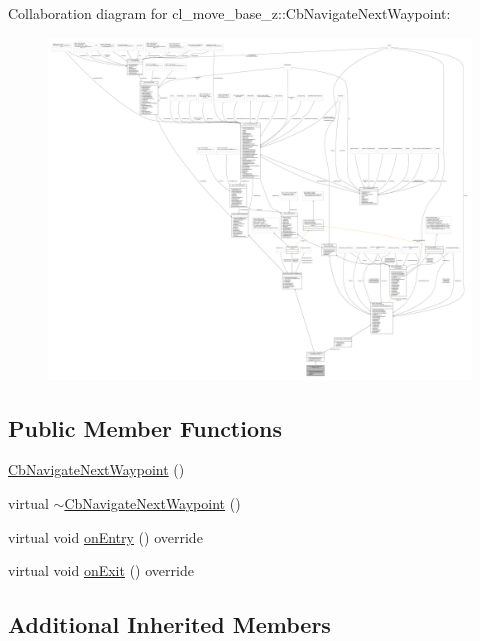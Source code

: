 Collaboration diagram for cl\+\_\+move\+\_\+base\+\_\+z\+:\+:Cb\+Navigate\+Next\+Waypoint\+:
\nopagebreak
\begin{figure}[H]
\begin{center}
\leavevmode
\includegraphics[width=350pt]{classcl__move__base__z_1_1CbNavigateNextWaypoint__coll__graph}
\end{center}
\end{figure}
\subsection*{Public Member Functions}
\begin{DoxyCompactItemize}
\item 
\hyperlink{classcl__move__base__z_1_1CbNavigateNextWaypoint_ae76bae37ab364bf6f48b8a200dd63ced}{Cb\+Navigate\+Next\+Waypoint} ()
\item 
virtual \hyperlink{classcl__move__base__z_1_1CbNavigateNextWaypoint_a35a4ab32307256f3e0a6433efb336227}{$\sim$\+Cb\+Navigate\+Next\+Waypoint} ()
\item 
virtual void \hyperlink{classcl__move__base__z_1_1CbNavigateNextWaypoint_a04913ef24344363669c1916b5df28493}{on\+Entry} () override
\item 
virtual void \hyperlink{classcl__move__base__z_1_1CbNavigateNextWaypoint_a1a848f7bfedd23fea7de59a940257b05}{on\+Exit} () override
\end{DoxyCompactItemize}
\subsection*{Additional Inherited Members}


